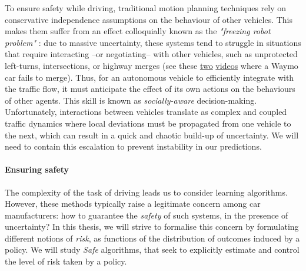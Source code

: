 To ensure safety while driving, traditional motion planning techniques rely on conservative independence assumptions on the behaviour of other vehicles. This makes them suffer from an effect colloquially known as the \emph{"freezing robot problem"} \citep{Trautman2010}: due to massive uncertainty, these systems tend to struggle in situations that require interacting --or negotiating-- with other vehicles, such as unprotected left-turns, intersections, or highway merges (see \eg these \href{https://www.youtube.com/watch?v=HjtiiGCe1pE}{two} \href{https://twitter.com/nitguptaa/status/990683818825736192}{videos} where a Waymo car fails to merge). 
Thus, for an autonomous vehicle to efficiently integrate with the traffic flow, it must anticipate the effect of its own actions on the behaviours of other agents. This skill is known as \emph{socially-aware} decision-making. Unfortunately, interactions between vehicles translate as complex and coupled traffic dynamics where local deviations must be propagated from one vehicle to the next, which can result in a quick and chaotic build-up of uncertainty. We will need to contain this escalation to prevent instability in our predictions.

\paragraph{Ensuring safety}

The complexity of the task of driving leads us to consider learning algorithms. However, these methods typically raise a legitimate concern among car manufacturers: how to guarantee the \emph{safety} of such systems, in the presence of uncertainty? In this thesis, we will strive to formalise this concern by formulating different notions of \emph{risk}, as functions of the distribution of outcomes induced by a policy. We will study \emph{Safe}  algorithms, that seek to explicitly estimate and control the level of risk taken by a policy.

